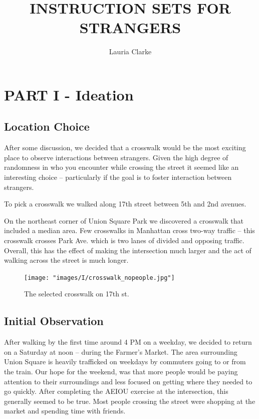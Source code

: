 \documentclass[11pt]{report}
\title{INSTRUCTION SETS FOR STRANGERS}
\date{}
\author{Lauria Clarke}
\begin{document}
\maketitle
\section*{PART I - Ideation}
\subsection*{Location Choice}

After some discussion, we decided that a crosswalk would be the most exciting place to observe interactions between strangers. Given the high degree of randomness in who you encounter while crossing the street it seemed like an interesting choice -- particularly if the goal is to foster interaction between strangers. 

To pick a crosswalk we walked along 17th street between 5th and 2nd avenues. 

On the northeast corner of Union Square Park we discovered a crosswalk that included a median area. Few crosswalks in Manhattan cross two-way traffic -- this crosswalk crosses Park Ave. which is two lanes of divided and opposing traffic. Overall, this has the effect of making the intersection much larger and the act of walking across the street is much longer. 

\begin{figure}[ht]
\centering
\texttt{[image: "images/I/crosswalk\_nopeople.jpg"]}
\caption{The selected crosswalk on 17th st.}
\label{fig:nopeople}
\end{figure}


\subsection*{Initial Observation}

After walking by the first time around 4 PM on a weekday, we decided to return on a Saturday at noon -- during the Farmer's Market. The area surrounding Union Square is heavily trafficked on weekdays by commuters going to or from the train. Our hope for the weekend, was that more people would be paying attention to their surroundings and less focused on getting where they needed to go quickly. After completing the AEIOU exercise at the intersection, this generally seemed to be true. Most people crossing the street were shopping at the market and spending time with friends. 
\end{document}
